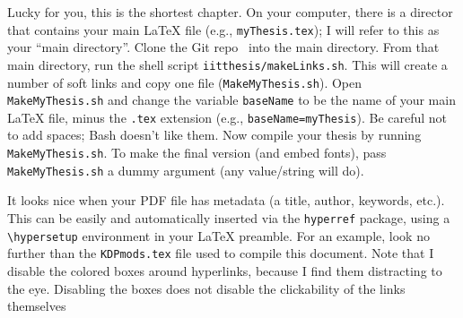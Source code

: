\documentclass{iitthesis}
\begin{document}
\textpages



Lucky for you, this is the shortest chapter. 
On your computer, there is a director that 
contains your main \LaTeX{} file (e.g., {\tt myThesis.tex});
I will refer to this as your ``main directory''.
Clone the Git repo~\cite{Pedersen:iitthesis} into the main directory.
From that main directory, run the shell script {\tt iitthesis/makeLinks.sh}.
This will create a number of soft links and copy one file ({\tt MakeMyThesis.sh}).
Open {\tt MakeMyThesis.sh} and change the variable {\tt baseName}
to be the name of your main \LaTeX{} file, minus the {\tt .tex} extension 
(e.g., {\tt baseName=myThesis}).
Be careful not to add spaces; Bash doesn't like them.
Now compile your thesis by running {\tt MakeMyThesis.sh}.
To make the final version (and embed fonts),
pass {\tt MakeMyThesis.sh} a dummy argument (any value/string will do).







It looks nice when your PDF file has metadata (a title, author, keywords, etc.). 
This can be easily and automatically inserted via the {\tt hyperref} package, 
using a \verb|\hypersetup| environment in your \LaTeX{} preamble.
For an example, look no further than the {\tt KDPmods.tex} file used to compile this document.
Note that I disable the colored boxes around hyperlinks,
because I find them distracting to the eye. 
Disabling the boxes does not disable the clickability of the links themselves
\end{document}
